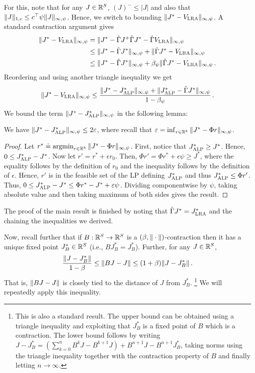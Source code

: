 \documentclass[12pt,draftcls,onecolumn]{IEEEtran}
\begin{document}
For this, note that for any $J\in \mathbb{R}^S$,
$(J)^-\le |J|$
and also that $\|J\|_{1,c} \le c^\top \psi \| J \|_{\infty,\psi}$. Hence, we switch to bounding
$\|J^* - V_{\text{\sc LRA}} \|_{\infty,\psi}$.
A standard contraction argument gives
\begin{align*}
\|J^* - V_{\text{\sc LRA}} \|_{\infty,\psi}
& =   \| J^* - \hat{\Gamma} J^ + \hat{\Gamma} J^* -\hat{\Gamma} V_{\text{\sc LRA}} \|_{\infty,\psi} \\
& \le \| J^* - \hat{\Gamma} J^*\|_{\infty,\psi} + \|\hat{\Gamma} J^* - V_{\text{\sc LRA}} \|_{\infty,\psi} \\
& \le \| J^* - \hat{\Gamma} J^*\|_{\infty,\psi} + \beta_\psi \|\hat{\Gamma} J^* - V_{\text{\sc LRA}} \|_{\infty,\psi}\,.
\end{align*}
Reordering and using another triangle inequality we get
\begin{align*}
\|J^* - V_{\text{\sc LRA}} \|_{\infty,\psi} \le \frac{
\|J^* - J^*_{\text{\sc ALP}}\|_{\infty,\psi} + \| J^*_{\text{\sc ALP}} - \hat{\Gamma} J^* \|_{\infty,\psi}
}{1-\beta_\psi}\,.
\end{align*}
We bound the term $\|J^* - J^*_{\text{\sc ALP}}\|_{\infty,\psi}$ in the following lemma:
\begin{lemma}\label{bestbndmn}
We have
$ %
\norm{J^*-\Jalpo}_{\mn}\leq 2 \epsilon
$, %
where recall that $\varepsilon = \inf_{r\in \mathbb{R}^k} \| J^*-\Phi r \|_{\infty,\psi}$.
\end{lemma}
\begin{proof}
Let $r^*\doteq \operatorname{argmin}_{r\in \mathbb{R}^k} \| J^*-\Phi r \|_{\infty,\psi}$.
First, notice that $J^*_{\text{\sc ALP}} \ge J^*$.
Hence, $0\le J^*_{\text{\sc ALP}} - J^*$.
Now let $r' = r^* + \epsilon r_0$. Then,
$\Phi r' = \Phi r^* + \epsilon \psi \ge J^*$, where the equality follows by the definition of $r_0$ and
the inequality follows by the definition of $\epsilon$.
Hence, $r'$ is in the feasible set of the LP defining $J^*_{\text{\sc ALP}}$ and thus $J^*_{\text{\sc ALP}} \le \Phi r'$.
Thus, $0\le J^*_{\text{\sc ALP}} - J^* \le \Phi r^* - J^* + \varepsilon \psi$. Dividing componentwise by $\psi$,
taking absolute value and then taking maximum of both sides gives the result.
\end{proof}
The proof of the main result is finished by noting that $\hat{\Gamma} J^* = J^*_{\text{\sc LRA}}$ and the chaining the inequalities we derived.

Now, recall further that if $B:\mathbb{R}^S \to \mathbb{R}^S$ is a $(\beta,\|\cdot\|)$-contraction then it has a unique fixed point $J^*_B\in \mathbb{R}^S$ (i.e., $B J^*_B= J^*_B$). Further, for any $J\in \mathbb{R}^S$,
\begin{align}
\label{eq:csdw}
\frac{\norm{J-J^*_B}}{1-\beta} \le \norm{ BJ - J } \le (1+\beta) \norm{J-J^*_B}\,.
\end{align}
That is, $\|BJ-J\|$ is closely tied to the distance of $J$ from $J^*_B$.%
\footnote{This is also a standard result. The upper bound can be obtained using a triangle inequality and exploiting that $J^*_B$ is a fixed point of $B$ which is a contraction. The lower bound follows by writing $J - J^*_B = (\sum_{k=0}^n B^k J - B^{k+1} J ) + B^{n+1} J - B^{n+1} J^*_B$, taking norms using the triangle inequality together with the contraction property of $B$ and finally letting $n\to \infty$.}
We will repeatedly apply this inequality.
\end{document}
